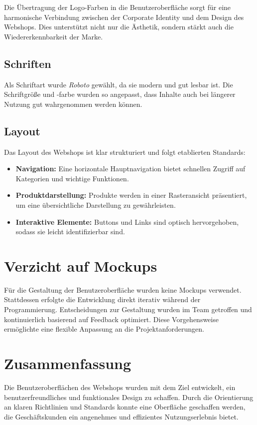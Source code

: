 \documentclass[%
	12pt,
	a4paper,
	oneside,
	parskip=full
]{scrbook}
\begin{document}
Die Übertragung der Logo-Farben in die Benutzeroberfläche sorgt für eine harmonische Verbindung zwischen der Corporate Identity und dem Design des Webshops. Dies unterstützt nicht nur die Ästhetik, sondern stärkt auch die Wiedererkennbarkeit der Marke.
\subsection{Schriften}
Als Schriftart wurde \textit{Roboto} gewählt, da sie modern und gut lesbar ist. Die Schriftgröße und -farbe wurden so angepasst, dass Inhalte auch bei längerer Nutzung gut wahrgenommen werden können.

\subsection{Layout}
Das Layout des Webshops ist klar strukturiert und folgt etablierten Standards:
\begin{itemize}
	\item \textbf{Navigation:} Eine horizontale Hauptnavigation bietet schnellen Zugriff auf Kategorien und wichtige Funktionen.
	\item \textbf{Produktdarstellung:} Produkte werden in einer Rasteransicht präsentiert, um eine übersichtliche Darstellung zu gewährleisten.
	\item \textbf{Interaktive Elemente:} Buttons und Links sind optisch hervorgehoben, sodass sie leicht identifizierbar sind.
\end{itemize}

\section{Verzicht auf Mockups}
Für die Gestaltung der Benutzeroberfläche wurden keine Mockups verwendet. Stattdessen erfolgte die Entwicklung direkt iterativ während der Programmierung. Entscheidungen zur Gestaltung wurden im Team getroffen und kontinuierlich basierend auf Feedback optimiert. Diese Vorgehensweise ermöglichte eine flexible Anpassung an die Projektanforderungen.

\section{Zusammenfassung}
Die Benutzeroberflächen des Webshops wurden mit dem Ziel entwickelt, ein benutzerfreundliches und funktionales Design zu schaffen. Durch die Orientierung an klaren Richtlinien und Standards konnte eine Oberfläche geschaffen werden, die Geschäftskunden ein angenehmes und effizientes Nutzungserlebnis bietet.
\end{document}
